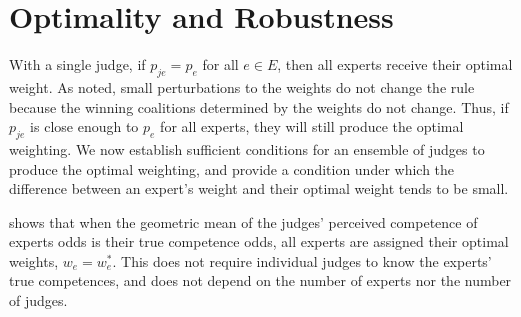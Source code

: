 \documentclass[letterpaper]{article} %
\newcommand{\judge}{\ensuremath{j} }
\newcommand{\experts}{\ensuremath{E} }
\newcommand{\expert}{\ensuremath{e} }
\begin{document}


% 
% 


\section{Optimality and Robustness}\label{sec:opt_robust}
With a single judge, if $p_{\judge \expert} = p_\expert$ for all $\expert \in \experts$, then all experts receive their optimal weight. As noted, small perturbations to the weights do not change the rule because the winning coalitions determined by the weights do not change. Thus, if $p_{\judge \expert}$ is close enough to $p_\expert$ for all experts, they will still produce the optimal weighting. We now establish sufficient conditions for an ensemble of judges to produce the optimal weighting, and provide a condition under which the difference between an expert's weight and their optimal weight tends to be small.
%

 shows that when the geometric mean of the judges' perceived competence of experts odds is their true competence odds, 
all experts are assigned their optimal weights, $w_\expert = w^*_\expert$. This does not require individual judges to know the experts' true competences, and does not depend on the number of experts nor the number of judges.
\end{document}
